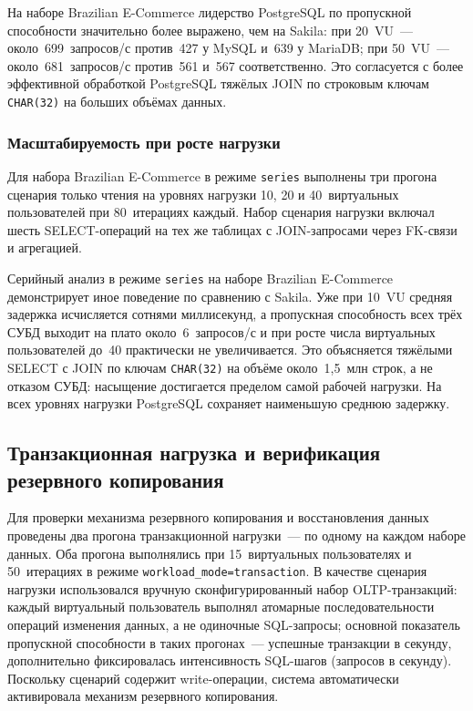На наборе Brazilian E-Commerce лидерство PostgreSQL по пропускной способности значительно более выражено, чем на Sakila: при 20~VU~--- около~699~запросов/с против~427 у MySQL и~639 у MariaDB; при 50~VU~--- около~681~запросов/с против~561 и~567 соответственно. Это согласуется с более эффективной обработкой PostgreSQL тяжёлых JOIN по строковым ключам \texttt{CHAR(32)} на больших объёмах данных.

\subsubsection{Масштабируемость при росте нагрузки}

Для набора Brazilian E-Commerce в режиме \texttt{series} выполнены три прогона сценария только чтения на уровнях нагрузки 10, 20 и 40~виртуальных пользователей при 80~итерациях каждый. Набор сценария нагрузки включал шесть SELECT-операций на тех же таблицах с JOIN-запросами через FK-связи и агрегацией.

Серийный анализ в режиме \texttt{series} на наборе Brazilian E-Commerce демонстрирует иное поведение по сравнению с Sakila. Уже при 10~VU средняя задержка исчисляется сотнями миллисекунд, а пропускная способность всех трёх СУБД выходит на плато около~6~запросов/с и при росте числа виртуальных пользователей до~40 практически не увеличивается. Это объясняется тяжёлыми SELECT с JOIN по ключам \texttt{CHAR(32)} на объёме около~1{,}5~млн строк, а не отказом СУБД: насыщение достигается пределом самой рабочей нагрузки. На всех уровнях нагрузки PostgreSQL сохраняет наименьшую среднюю задержку.

\subsection{Транзакционная нагрузка и верификация резервного копирования}

Для проверки механизма резервного копирования и восстановления данных проведены два прогона транзакционной нагрузки~--- по одному на каждом наборе данных. Оба прогона выполнялись при 15~виртуальных пользователях и 50~итерациях в режиме \texttt{workload\_mode=transaction}. В качестве сценария нагрузки использовался вручную сконфигурированный набор OLTP-транзакций: каждый виртуальный пользователь выполнял атомарные последовательности операций изменения данных, а не одиночные SQL-запросы; основной показатель пропускной способности в таких прогонах~--- успешные транзакции в секунду, дополнительно фиксировалась интенсивность SQL-шагов (запросов в секунду). Поскольку сценарий содержит write-операции, система автоматически активировала механизм резервного копирования.

